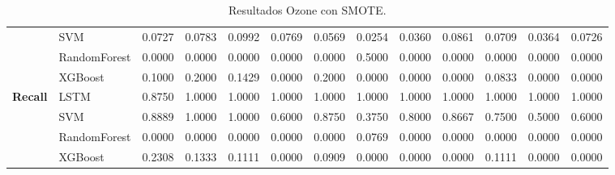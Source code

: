 \begin{table}[h]
\begin{adjustbox}{max width=15cm}
\begin{tabular}{|c|l|r|r|r|r|r|r|r|r|r|r|r|}
			& SVM &  0.0727 &  0.0783 &  0.0992 &  0.0769 &  0.0569 &  0.0254 &  0.0360 &  0.0861 &  0.0709 &  0.0364 &  0.0726 \\
			& RandomForest &  0.0000 &  0.0000 &  0.0000 &  0.0000 &  0.0000 &  0.5000 &  0.0000 &  0.0000 &  0.0000 &  0.0000 &  0.0000 \\
			& XGBoost &  0.1000 &  0.2000 &  0.1429 &  0.0000 &  0.2000 &  0.0000 &  0.0000 &  0.0000 &  0.0833 &  0.0000 &  0.0000 \\
			\hline
			\textbf{Recall} & LSTM &  0.8750 &  1.0000 &  1.0000 &  1.0000 &  1.0000 &  1.0000 &  1.0000 &  1.0000 &  1.0000 &  1.0000 &  1.0000 \\
			& SVM &  0.8889 &  1.0000 &  1.0000 &  0.6000 &  0.8750 &  0.3750 &  0.8000 &  0.8667 &  0.7500 &  0.5000 &  0.6000 \\
			& RandomForest &  0.0000 &  0.0000 &  0.0000 &  0.0000 &  0.0000 &  0.0769 &  0.0000 &  0.0000 &  0.0000 &  0.0000 &  0.0000 \\
			& XGBoost &  0.2308 &  0.1333 &  0.1111 &  0.0000 &  0.0909 &  0.0000 &  0.0000 &  0.0000 &  0.1111 &  0.0000 &  0.0000 \\
			\hline
		\end{tabular}
	\end{adjustbox}
	\caption{Resultados Ozone con SMOTE.}
	\label{tab:Ozone_SMOTE}
\end{table}


